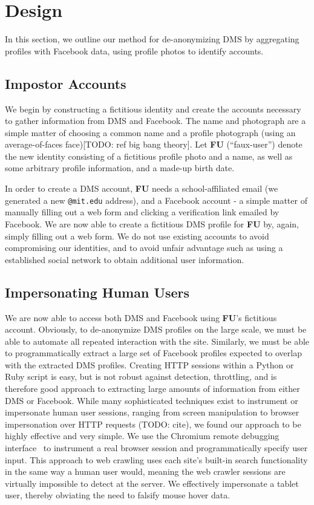 \section{Design}
\label{sec:design}

In this section, we outline our method for de-anonymizing DMS by aggregating profiles with Facebook data, using profile photos to identify accounts.

\subsection{Impostor Accounts}
\label{sec:design_accounts}

We begin by constructing a fictitious identity and create the accounts necessary to gather information from DMS and Facebook.
The name and photograph are a simple matter of choosing a common name and a profile photograph (using an average-of-faces face)[TODO: ref big bang theory]. Let \textbf{FU} (``faux-user'') denote the new identity consisting of a fictitious profile photo and a name, as well as some arbitrary profile information, and a made-up birth date.

In order to create a DMS account, \textbf{FU} needs a school-affiliated email (we generated a new \texttt{@mit.edu} address), and a Facebook account - a simple matter of manually filling out a web form and clicking a verification link emailed by Facebook. We are now able to create a fictitious DMS profile for \textbf{FU} by, again, simply filling out a web form.
We do not use existing accounts to avoid compromising our identities, and to avoid unfair advantage such as using a established social network to obtain additional user information.

\subsection{Impersonating Human Users}
\label{sec:design_debug}

We are now able to access both DMS and Facebook using \textbf{FU}'s fictitious account.
Obviously, to de-anonymize DMS profiles on the large scale, we must be able to automate all repeated interaction with the site.
Similarly, we must be able to programmatically extract a large set of Facebook profiles expected to overlap with the extracted DMS profiles.
Creating HTTP sessions within a Python or Ruby script is easy, but is not robust against detection, throttling, and is therefore good approach to extracting large amounts of information from either DMS or Facebook.
While many sophisticated techniques exist to instrument or impersonate human user sessions, ranging from screen manipulation \cite{yeh2009sikuli} to browser impersonation over HTTP requests (TODO: cite), we found our approach to be highly effective and very simple.
We use the Chromium remote debugging interface~\cite{chrome-rdb} to instrument a real browser session and programmatically specify user input.
This approach to web crawling uses each site's built-in search functionality in the same way a human user would, meaning the web crawler sessions are virtually impossible to detect at the server.
We effectively impersonate a tablet user, thereby obviating the need to falsify mouse hover data.

